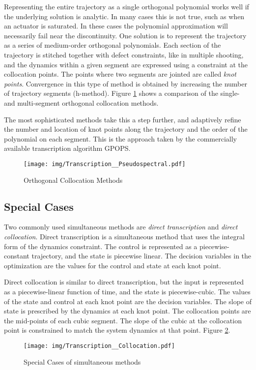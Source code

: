 \par Representing the entire trajectory as a single orthogonal polynomial works well if the underlying solution is analytic. In many cases this is not true, such as when an actuator is saturated. In these cases the polynomial approximation will necessarily fail near the discontinuity. One solution is to represent the trajectory as a series of medium-order orthogonal polynomials. Each section of the trajectory is stitched together with defect constraints, like in multiple shooting, and the dynamics within a given segment are expressed using a constraint at the collocation points. The points where two segments are jointed are called {\em knot points}. Convergence in this type of method is obtained by increasing the number of trajectory segments (h-method). Figure \ref{fig:Transcription__Pseudospectral} shows a comparison of the single- and multi-segment orthogonal collocation methods.

\par The most sophisticated methods take this a step further, and adaptively refine the number and location of knot points along the trajectory and the order of the polynomial on each segment\cite{PattersonHagerRao}. This is the approach taken by the commercially available transcription algorithm GPOPS\cite{Patterson2013}.


\begin{figure}
\centering
\texttt{[image: img/Transcription\_\_Pseudospectral.pdf]}
\caption{Orthogonal Collocation Methods}
\label{fig:Transcription__Pseudospectral}
\end{figure}

\subsection{Special Cases}

Two commonly used simultaneous methods are {\em direct transcription} and {\em direct collocation}. Direct transcription is a simultaneous method that uses the integral form of the dynamics constraint. The control is represented as a piecewise-constant trajectory, and the state is piecewise linear. The decision variables in the optimization are the values for the control and state at each knot point.

\par Direct collocation is similar to direct transcription, but the input is represented as a piecewise-linear function of time, and the state is piecewise-cubic. The values of the state and control at each knot point are the decision variables. The slope of state is prescribed by the dynamics at each knot point. The collocation points are the mid-points of each cubic segment. The slope of the cubic at the collocation point is constrained to match the system dynamics at that point. Figure \ref{fig:Transcription_Collocation}.

\begin{figure}
\centering
\texttt{[image: img/Transcription\_\_Collocation.pdf]}
\caption{Special Cases of simultaneous methods}
\label{fig:Transcription_Collocation}
\end{figure}


